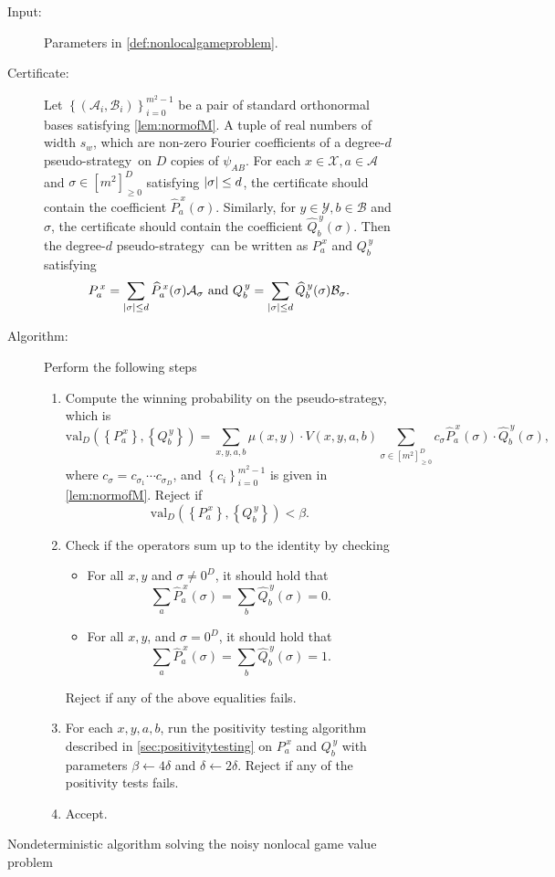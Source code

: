 \documentclass[11pt]{article}
\theoremstyle{plain}
\theoremstyle{definition}
\newcommand {\set} [1] {\ensuremath{ \left\lbrace #1 \right\rbrace }}
\newcommand {\br} [1] {\ensuremath{ \left( #1 \right) }}
\DeclarePairedDelimiter{\abs}{\lvert}{\rvert}
\newenvironment{Algorithm}{\begin{framed}}{\end{framed}}
\newcommand{\gval}[3]{\ensuremath{\mathrm{val}_{#1}\br{\set{#2},\set{#3}}}}
\newcommand{\dlbo} {\ensuremath{{D}}}
\newcommand{\dldd} {\ensuremath{{d}}}
\newcommand{\pseudostrategy} {pseudo-strategy}
\newcommand{\Pss} {\ensuremath{P^{\,x}_a}}
\newcommand{\Qss} {\ensuremath{Q^{\,y}_b}}
\newcommand{\Pff} {\ensuremath{\widehat{P}^{\,x}_a(\sigma)}}
\newcommand{\Qff} {\ensuremath{\widehat{Q}^{\,y}_b(\sigma)}}
\newcommand{\calX}{\mathcal{X}}
\newcommand{\calY}{\mathcal{Y}}
\newcommand{\calA}{\mathcal{A}}
\newcommand{\calB}{\mathcal{B}}
\newcommand{\1}{\mathbb{1}} %
\begin{document}
\begin{figure}
\begin{Algorithm}
\begin{description}
    \item[Input:]
        Parameters in \cref{def:nonlocalgameproblem}.
    \item[Certificate:]
        Let $\set{\br{\calA_i,\calB_i}}_{i=0}^{m^2-1}$ be a pair of standard orthonormal bases satisfying \cref{lem:normofM}.
        A tuple of real numbers of width $s_w$, which are non-zero Fourier coefficients of
        a degree-$\dldd$ \pseudostrategy\ on $\dlbo$ copies of $\psi_{AB}$.
        For each $x\in\calX, a\in\calA$ and $\sigma\in[m^2]_{\ge0}^\dlbo$ satisfying $\abs{\sigma}\le\dldd$,
        the certificate should contain the coefficient $\Pff$.
        Similarly, for $y\in\calY, b\in\calB$ and $\sigma$, the certificate should contain the coefficient $\Qff$.
        Then the degree-$\dldd$ \pseudostrategy\ can be written as $\Pss$ and $\Qss$ satisfying
        $$\Pss = \sum_{\abs{\sigma}\le\dldd}\Pff\calA_\sigma~\mbox{and}~\Qss = \sum_{\abs{\sigma}\le\dldd}\Qff\calB_\sigma.$$
    \item[Algorithm:] Perform the following steps
        \begin{enumerate}
          \item Compute the winning probability on the pseudo-strategy, which is 
                $$\gval{\dlbo}{\Pss}{\Qss} = \sum_{x, y, a, b}\mu(x, y)\cdot V(x, y, a, b)\sum_{\sigma\in[m^2]_{\geq 0}^D}c_{\sigma}\Pff\cdot \Qff,$$
                where $c_{\sigma}=c_{\sigma_1}\cdots c_{\sigma_D}$, and $\set{c_i}_{i=0}^{m^2-1}$ is given in \cref{lem:normofM}.
                Reject if $$\gval{\dlbo}{\Pss}{\Qss} < \beta.$$
          \item Check if the operators sum up to the identity by checking
                \begin{itemize}
                  \item For all $x, y$ and $\sigma\neq0^\dlbo$, it should hold that
                        $$\sum_{a}\Pff = \sum_b\Qff=0.$$
                  \item For all $x, y$, and $\sigma=0^\dlbo$, it should hold that
                        $$\sum_{a}\Pff=\sum_{b}\Qff=1.$$
                \end{itemize}
                Reject if any of the above equalities fails.
          \item For each $x, y, a, b$,
                run the positivity testing algorithm described in \cref{sec:positivitytesting} on $\Pss$ and $\Qss$ with parameters $\beta\gets4\delta$ and $\delta\gets2\delta$.
                Reject if any of the positivity tests fails.
          \item Accept.
        \end{enumerate}
\end{description}

\end{Algorithm}
\caption{Nondeterministic algorithm solving the noisy nonlocal game value problem}\label{fig:valuealg}
\end{figure}
\end{document}
